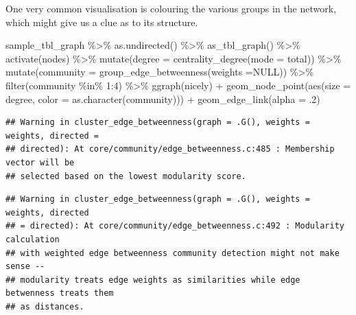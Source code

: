 \documentclass[
]{book}
\newenvironment{Shaded}{\begin{snugshade}}{\end{snugshade}}
\newcommand{\AttributeTok}[1]{\textcolor[rgb]{0.77,0.63,0.00}{#1}}
\newcommand{\ConstantTok}[1]{\textcolor[rgb]{0.00,0.00,0.00}{#1}}
\newcommand{\DecValTok}[1]{\textcolor[rgb]{0.00,0.00,0.81}{#1}}
\newcommand{\FunctionTok}[1]{\textcolor[rgb]{0.00,0.00,0.00}{#1}}
\newcommand{\NormalTok}[1]{#1}
\newcommand{\SpecialCharTok}[1]{\textcolor[rgb]{0.00,0.00,0.00}{#1}}
\newcommand{\StringTok}[1]{\textcolor[rgb]{0.31,0.60,0.02}{#1}}
\begin{document}
One very common visualisation is colouring the various groups in the network, which might give us a clue as to its structure.

\begin{Shaded}
\begin{Highlighting}[]
\NormalTok{sample\_tbl\_graph }\SpecialCharTok{\%\textgreater{}\%} 
  \FunctionTok{as.undirected}\NormalTok{() }\SpecialCharTok{\%\textgreater{}\%} 
  \FunctionTok{as\_tbl\_graph}\NormalTok{() }\SpecialCharTok{\%\textgreater{}\%} 
  \FunctionTok{activate}\NormalTok{(nodes) }\SpecialCharTok{\%\textgreater{}\%} 
  \FunctionTok{mutate}\NormalTok{(}\AttributeTok{degree =} \FunctionTok{centrality\_degree}\NormalTok{(}\AttributeTok{mode =} \StringTok{\textquotesingle{}total\textquotesingle{}}\NormalTok{))  }\SpecialCharTok{\%\textgreater{}\%} 
  \FunctionTok{mutate}\NormalTok{(}\AttributeTok{community =} \FunctionTok{group\_edge\_betweenness}\NormalTok{(}\AttributeTok{weights =}\ConstantTok{NULL}\NormalTok{)) }\SpecialCharTok{\%\textgreater{}\%} 
  \FunctionTok{filter}\NormalTok{(community }\SpecialCharTok{\%in\%} \DecValTok{1}\SpecialCharTok{:}\DecValTok{4}\NormalTok{) }\SpecialCharTok{\%\textgreater{}\%} 
  \FunctionTok{ggraph}\NormalTok{(}\StringTok{\textquotesingle{}nicely\textquotesingle{}}\NormalTok{) }\SpecialCharTok{+} 
  \FunctionTok{geom\_node\_point}\NormalTok{(}\FunctionTok{aes}\NormalTok{(}\AttributeTok{size =}\NormalTok{ degree, }\AttributeTok{color =} \FunctionTok{as.character}\NormalTok{(community))) }\SpecialCharTok{+} 
  \FunctionTok{geom\_edge\_link}\NormalTok{(}\AttributeTok{alpha =}\NormalTok{ .}\DecValTok{2}\NormalTok{)}
\end{Highlighting}
\end{Shaded}

\begin{verbatim}
## Warning in cluster_edge_betweenness(graph = .G(), weights = weights, directed =
## directed): At core/community/edge_betweenness.c:485 : Membership vector will be
## selected based on the lowest modularity score.
\end{verbatim}

\begin{verbatim}
## Warning in cluster_edge_betweenness(graph = .G(), weights = weights, directed
## = directed): At core/community/edge_betweenness.c:492 : Modularity calculation
## with weighted edge betweenness community detection might not make sense --
## modularity treats edge weights as similarities while edge betwenness treats them
## as distances.
\end{verbatim}
\end{document}
